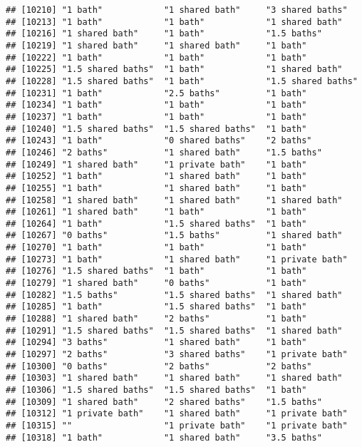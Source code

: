 \documentclass[
]{article}
\begin{document}
\begin{verbatim}
## [10210] "1 bath"            "1 shared bath"     "3 shared baths"   
## [10213] "1 bath"            "1 bath"            "1 shared bath"    
## [10216] "1 shared bath"     "1 bath"            "1.5 baths"        
## [10219] "1 shared bath"     "1 shared bath"     "1 bath"           
## [10222] "1 bath"            "1 bath"            "1 bath"           
## [10225] "1.5 shared baths"  "1 bath"            "1 shared bath"    
## [10228] "1.5 shared baths"  "1 bath"            "1.5 shared baths" 
## [10231] "1 bath"            "2.5 baths"         "1 bath"           
## [10234] "1 bath"            "1 bath"            "1 bath"           
## [10237] "1 bath"            "1 bath"            "1 bath"           
## [10240] "1.5 shared baths"  "1.5 shared baths"  "1 bath"           
## [10243] "1 bath"            "0 shared baths"    "2 baths"          
## [10246] "2 baths"           "1 shared bath"     "1.5 baths"        
## [10249] "1 shared bath"     "1 private bath"    "1 bath"           
## [10252] "1 bath"            "1 shared bath"     "1 bath"           
## [10255] "1 bath"            "1 shared bath"     "1 bath"           
## [10258] "1 shared bath"     "1 shared bath"     "1 shared bath"    
## [10261] "1 shared bath"     "1 bath"            "1 bath"           
## [10264] "1 bath"            "1.5 shared baths"  "1 bath"           
## [10267] "0 baths"           "1.5 baths"         "1 shared bath"    
## [10270] "1 bath"            "1 bath"            "1 bath"           
## [10273] "1 bath"            "1 shared bath"     "1 private bath"   
## [10276] "1.5 shared baths"  "1 bath"            "1 bath"           
## [10279] "1 shared bath"     "0 baths"           "1 bath"           
## [10282] "1.5 baths"         "1.5 shared baths"  "1 shared bath"    
## [10285] "1 bath"            "1.5 shared baths"  "1 bath"           
## [10288] "1 shared bath"     "2 baths"           "1 bath"           
## [10291] "1.5 shared baths"  "1.5 shared baths"  "1 shared bath"    
## [10294] "3 baths"           "1 shared bath"     "1 bath"           
## [10297] "2 baths"           "3 shared baths"    "1 private bath"   
## [10300] "0 baths"           "2 baths"           "2 baths"          
## [10303] "1 shared bath"     "1 shared bath"     "1 shared bath"    
## [10306] "1.5 shared baths"  "1.5 shared baths"  "1 bath"           
## [10309] "1 shared bath"     "2 shared baths"    "1.5 baths"        
## [10312] "1 private bath"    "1 shared bath"     "1 private bath"   
## [10315] ""                  "1 private bath"    "1 private bath"   
## [10318] "1 bath"            "1 shared bath"     "3.5 baths"        

\end{verbatim}
\end{document}
